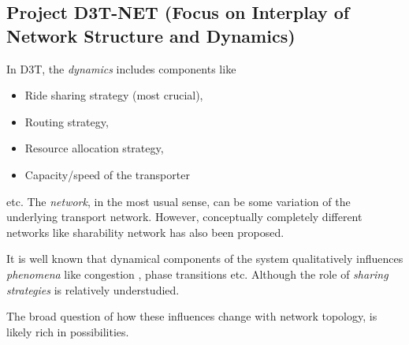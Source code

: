 \subsection*{Project D3T-NET (Focus on Interplay of Network Structure and Dynamics)}
In D3T, the \emph{dynamics} includes components like 
\begin{itemize}
\item Ride sharing strategy (most crucial),
\item Routing strategy,
\item Resource allocation strategy,
\item Capacity/speed of the transporter
\end{itemize}
etc. The \emph{network}, in the most usual sense, can be some variation of the underlying transport network. However, 
conceptually completely different networks like sharability network \cite{santi_quantifying_2014} has also been proposed. 

It is well known that dynamical components \cite{zhang_probability_2013,guan_efficient_2013,santi_quantifying_2014} of the system qualitatively influences \emph{phenomena} like
congestion \cite{hyytia_congestive_2010, de_martino_congestion_2009}, phase transitions \cite{barankai_effect_2012}  etc. Although the role of \emph{sharing strategies} is relatively understudied. 

The broad question of how these influences change with network topology, is likely rich in possibilities.
